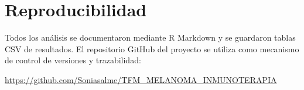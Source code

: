 \section{Reproducibilidad}

Todos los análisis se documentaron mediante R Markdown y se guardaron tablas CSV de resultados. El repositorio GitHub del proyecto se utiliza como mecanismo de control de versiones y trazabilidad:

\begin{center}
\url{https://github.com/Soniasalme/TFM_MELANOMA_INMUNOTERAPIA}
\end{center}
